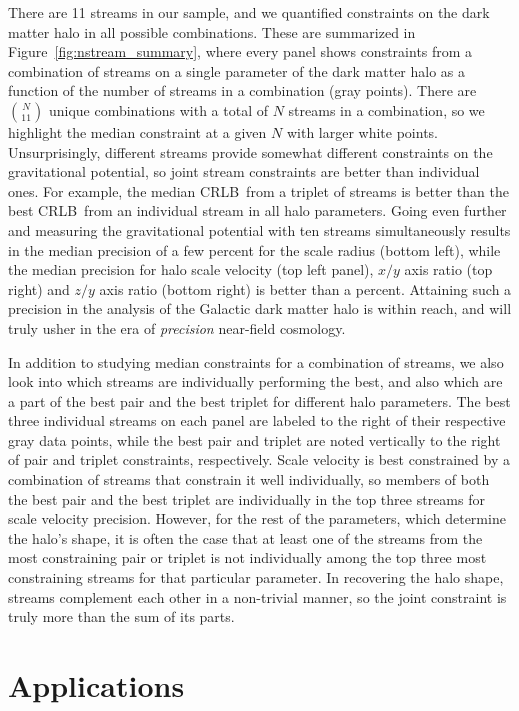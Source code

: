 \documentclass[modern]{aastex61}
\newcommand{\acronym}[1]{{\small{#1}}}
\newcommand{\CRLB}{\acronym{CRLB}}
\begin{document}
There are 11 streams in our sample, and we quantified constraints on the dark matter halo in all possible combinations.
These are summarized in Figure~\ref{fig:nstream_summary}, where every panel shows constraints from a combination of streams on a single parameter of the dark matter halo as a function of the number of streams in a combination (gray points).
There are $\binom{N}{11}$ unique combinations with a total of $N$ streams in a combination, so we highlight the median constraint at a given $N$ with larger white points.
Unsurprisingly, different streams provide somewhat different constraints on the gravitational potential, so joint stream constraints are better than individual ones.
For example, the median \CRLB\ from a triplet of streams is better than the best \CRLB\ from an individual stream in all halo parameters.
Going even further and measuring the gravitational potential with ten streams simultaneously results in the median precision of a few percent for the scale radius (bottom left), while the median precision for halo scale velocity (top left panel), $x/y$ axis ratio (top right) and $z/y$ axis ratio (bottom right) is better than a percent.
Attaining such a precision in the analysis of the Galactic dark matter halo is within reach, and will truly usher in the era of \emph{precision} near-field cosmology.

In addition to studying median constraints for a combination of streams, we also look into which streams are individually performing the best, and also which are a part of the best pair and the best triplet for different halo parameters.
The best three individual streams on each panel are labeled to the right of their respective gray data points, while the best pair and triplet are noted vertically to the right of pair and triplet constraints, respectively.
Scale velocity is best constrained by a combination of streams that constrain it well individually, so members of both the best pair and the best triplet are individually in the top three streams for scale velocity precision.
However, for the rest of the parameters, which determine the halo's shape, it is often the case that at least one of the streams from the most constraining pair or triplet is not individually among the top three most constraining streams for that particular parameter.
In recovering the halo shape, streams complement each other in a non-trivial manner, so the joint constraint is truly more than the sum of its parts.


\section{Applications}
\label{sec:applications}
\end{document}
